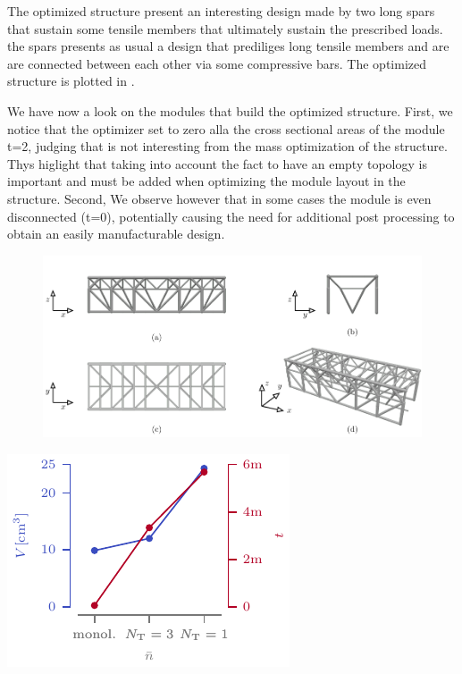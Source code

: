 The optimized structure present an interesting design made by two long spars that sustain some tensile members that ultimately sustain the prescribed loads. the spars presents as usual a design that prediliges long tensile members and are are connected between each other via some compressive bars. The optimized structure is plotted in . 

We have now a look on the modules that build the optimized structure. First, we notice that the optimizer set to zero alla the cross sectional areas of the module t=2, judging that is not interesting from the mass optimization of the structure. Thys higlight that taking into account the fact to have an empty topology is important and must be added  when optimizing the module layout in the structure. Second, We observe however that in some cases the module is even disconnected (t=0), potentially causing the need for additional post processing to obtain an easily manufacturable design.

\begin{figure}
    \centering
    \includegraphics{figures/05_cellular_opt/00_multiple_topology/support_sol.pdf}
    \caption{}
    \label{fig:05_multiple_topology_sol}
\end{figure}

\begin{marginfigure}
    \centering
    \includegraphics[width=\linewidth]{figures/05_cellular_opt/00_multiple_tab/multi_tab.pdf}
    \caption{}
    \label{fig:05_multiple_topology_sol_graph}
\end{marginfigure}

